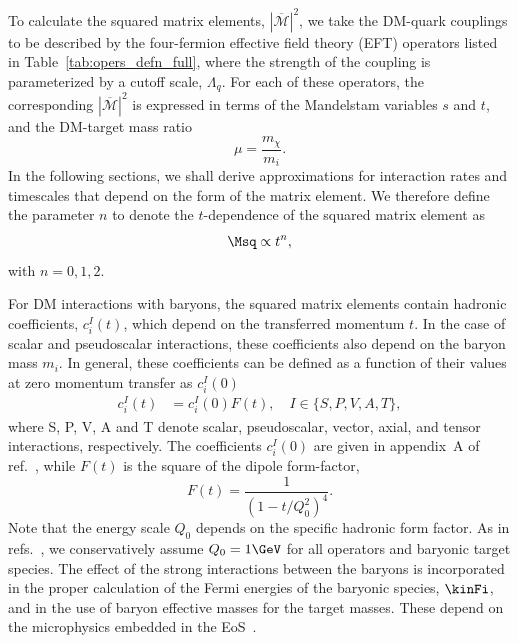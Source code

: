 To calculate the squared matrix elements, $|\overline{\mathcal{M}}|^2$, we take the DM-quark couplings to be described by the four-fermion effective field theory (EFT) operators listed in Table~\ref{tab:opers_defn_full}, where the strength of the coupling is parameterized by a cutoff scale, $\Lambda_q$. For each of these operators, the corresponding $|\overline{\mathcal{M}}|^2$ is expressed in terms of the Mandelstam variables $s$ and $t$, and the DM-target mass ratio 
\begin{equation}
  \mu=\frac{m_\chi}{m_i}.
\end{equation}
In the following sections, we shall derive approximations for interaction rates and timescales that depend on the form of the matrix element. We therefore define the parameter $n$ to denote the $t$-dependence of  the squared matrix element as 
\begin{equation}
\Msq \propto t^n, 
\label{eq:ndef}
\end{equation}
with $n=0,1,2$. 

For DM interactions with baryons, the squared matrix elements contain hadronic coefficients, $c_i^I(t)$, which depend on the transferred momentum $t$. In the case of scalar and pseudoscalar interactions, these coefficients also depend on the baryon mass $m_i$. 
In general, these coefficients can be defined as a function of their values at zero momentum transfer as $c_i^I(0)$~\cite{Thomas:2001kw_Structurenucleon}
\begin{eqnarray}
c_i^I(t) &= c_i^I(0) F(t),\quad I\in\{S,P,V,A,T\},\label{eq:tdep}
\end{eqnarray}
where S, P, V, A and T denote scalar, pseudoscalar, vector, axial, and tensor interactions, respectively. The coefficients $c_i^I(0)$  are given in appendix~A of ref.~\cite{Anzuini:2021lnv_nov_Improvedtreatmentdark}, while $F(t)$ is the square of the dipole form-factor,
%
\begin{equation}
    F(t) = \frac{1}{(1-t/Q_0^2)^4}. 
    \label{eq:formfactor}
  \end{equation}
%
Note that the energy scale $Q_0$ depends on the specific hadronic form factor. As in refs.~\cite{Bell:2020obw_sep_NucleonStructureStrong,Anzuini:2021lnv_nov_Improvedtreatmentdark}, we conservatively assume $Q_0=1\GeV$ for all operators and baryonic target species. 
%
The effect of the strong interactions between the baryons is incorporated in the proper calculation of the Fermi energies of the baryonic species, $\kinFi$, and in the use of baryon effective masses for the target masses. These depend on the microphysics embedded in the EoS~\cite{Bell:2020jou_sep_ImprovedTreatmentDark,Anzuini:2021lnv_nov_Improvedtreatmentdark}. 



